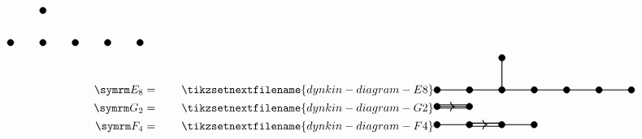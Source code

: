 \documentclass[fleqn, a4paper, openany]{memoir}
\begin{document}
\begin{align}
\begin{tikzpicture}[dynkin node/.style = {fill}, dynkin wire/.style = {thick}, baseline=-0.1cm]
            \draw [dynkin node] (1, 0) circle [radius=0.1cm];
            \draw [dynkin node] (2, 0) circle [radius=0.1cm];
            \draw [dynkin node] (3, 0) circle [radius=0.1cm];
            \draw [dynkin node] (4, 0) circle [radius=0.1cm];
            \draw [dynkin node] (5, 0) circle [radius=0.1cm];
            \draw [dynkin node] (2, 1) circle [radius=0.1cm];
        \end{tikzpicture}
        \\
        \E[8] &= \qquad
        \tikzsetnextfilename{dynkin-diagram-E8}
        \begin{tikzpicture}[dynkin node/.style = {fill}, dynkin wire/.style = {thick}, baseline=-0.1cm]
            \draw [dynkin wire] (0, 0) -- ++ (6, 0);
            \draw [dynkin wire] (2, 0) -- ++ (0, 1);
            \draw [dynkin node] (0, 0) circle [radius=0.1cm];
            \draw [dynkin node] (1, 0) circle [radius=0.1cm];
            \draw [dynkin node] (2, 0) circle [radius=0.1cm];
            \draw [dynkin node] (3, 0) circle [radius=0.1cm];
            \draw [dynkin node] (4, 0) circle [radius=0.1cm];
            \draw [dynkin node] (5, 0) circle [radius=0.1cm];
            \draw [dynkin node] (6, 0) circle [radius=0.1cm];
            \draw [dynkin node] (2, 1) circle [radius=0.1cm];
        \end{tikzpicture}
        \\
        \G[2] &= \qquad
        \tikzsetnextfilename{dynkin-diagram-G2}
        \begin{tikzpicture}[dynkin node/.style = {fill}, dynkin wire/.style = {thick}]
            \draw [dynkin wire] (0, 0) -- ++ (1, 0);
            \draw [dynkin wire] (0, -0.05) -- ++ (1, 0);
            \draw [dynkin wire] (0, 0.05) -- ++ (1, 0);
            \draw [dynkin node] (0, 0) circle [radius=0.1cm];
            \draw [dynkin node] (1, 0) circle [radius=0.1cm];
            \draw [-{>[width=0.3cm, length=0.15cm]}, dynkin wire] (0.55, 0) -- ++ (0.001, 0);
        \end{tikzpicture}
        \\
        \F[4] &= \qquad
        \tikzsetnextfilename{dynkin-diagram-F4}
        \begin{tikzpicture}[dynkin node/.style = {fill}, dynkin wire/.style = {thick}]
            \draw [dynkin wire] (0, 0) -- ++ (1, 0);
            \draw [dynkin wire] (1, -0.05) -- ++ (1, 0);
            \draw [dynkin wire] (1, 0.05) -- ++ (1, 0);
            \draw [dynkin wire] (2, 0) -- ++ (1, 0);
            \draw [dynkin node] (0, 0) circle [radius=0.1cm];
            \draw [dynkin node] (1, 0) circle [radius=0.1cm];
            \draw [dynkin node] (2, 0) circle [radius=0.1cm];
            \draw [dynkin node] (3, 0) circle [radius=0.1cm];
            \draw [-{>[width=0.3cm, length=0.15cm]}, dynkin wire] (1.55, 0) -- ++ (0.001, 0);
        \end{tikzpicture}
    \end{align}
    \endgroup
    
\end{document}
